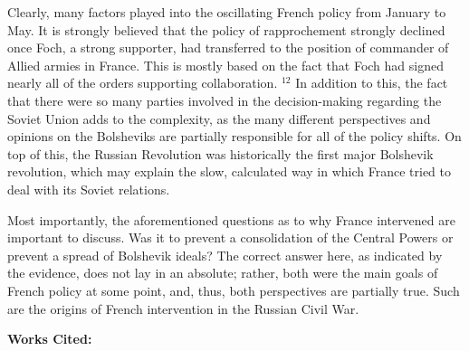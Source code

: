\begin{justify}
  \hspace{.5 in} Clearly, many factors played into the oscillating French policy from January to May. It is strongly believed that the policy of rapprochement strongly declined once Foch, a strong supporter, had transferred to the position of commander of Allied armies in France. This is mostly based on the fact that Foch had signed nearly all of the orders supporting collaboration. $^{12}$ In addition to this, the fact that there were so many parties involved in the decision-making regarding the Soviet Union adds to the complexity, as the many different perspectives and opinions on the Bolsheviks are partially responsible for all of the policy shifts. On top of this, the Russian Revolution was historically the first major Bolshevik revolution, which may explain the slow, calculated way in which France tried to deal with its Soviet relations. 

  \hspace{.5 in} Most importantly, the aforementioned questions as to why France intervened are important to discuss. Was it to prevent a consolidation of the Central Powers or prevent a spread of Bolshevik ideals? The correct answer here, as indicated by the evidence, does not lay in an absolute; rather, both were the main goals of French policy at some point, and, thus, both perspectives are partially true. Such are the origins of French intervention in the Russian Civil War.

\end{justify}

\newpage

\begin{center}
  
  \textbf{Works Cited:}

\end{center}

\singlespacing

\begin{justify} 


\end{justify}

